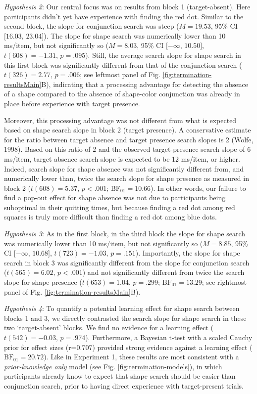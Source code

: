 \documentclass[12pt,twoside]{reedthesis}
\begin{document}
\emph{Hypothesis 2}: Our central focus was on results from block 1 (target-absent). Here participants didn't yet have experience with finding the red dot. Similar to the second block, the slope for conjunction search was steep (\(M = 19.53\), 95\% CI \([16.03\), \(23.04]\)). The slope for shape search was numerically lower than 10 ms/item, but not significantly so (\(M = 8.03\), 95\% CI \([-\infty\), \(10.50]\), \(t(608) = -1.31\), \(p = .095\)). Still, the average search slope for shape search in this first block was significantly different from that of the conjunction search (\(t(326) = 2.77\), \(p = .006\); see leftmost panel of Fig. \ref{fig:termination-resultsMain}B), indicating that a processing advantage for detecting the absence of a shape compared to the absence of shape-color conjunction was already in place before experience with target presence.

Moreover, this processing advantage was not different from what is expected based on shape search slope in block 2 (target presence). A conservative estimate for the ratio between target absence and target presence search slopes is 2 (Wolfe, 1998). Based on this ratio of 2 and the observed target-presence search slope of 6 ms/item, target absence search slope is expected to be 12 ms/item, or higher. Indeed, search slope for shape absence was not significantly different from, and numerically lower than, twice the search slope for shape presence as measured in block 2 (\(t(608) = 5.37\), \(p < .001\); \(\mathrm{BF}_{\textrm{01}} = 10.66\)). In other words, our failure to find a pop-out effect for shape absence was not due to participants being suboptimal in their quitting times, but because finding a red dot among red squares is truly more difficult than finding a red dot among blue dots.

\emph{Hypothesis 3}: As in the first block, in the third block the slope for shape search was numerically lower than 10 ms/item, but not significantly so (\(M = 8.85\), 95\% CI \([-\infty\), \(10.68]\), \(t(723) = -1.03\), \(p = .151\)). Importantly, the slope for shape search in block 3 was significantly different from the slope for conjunction search (\(t(565) = 6.02\), \(p < .001\)) and not significantly different from twice the search slope for shape presence (\(t(653) = 1.04\), \(p = .299\); \(\mathrm{BF}_{\textrm{01}} = 13.29\); see rightmost panel of Fig. \ref{fig:termination-resultsMain}B).

\emph{Hypothesis 4}: To quantify a potential learning effect for shape search between blocks 1 and 3, we directly contrasted the search slope for shape search in these two `target-absent' blocks. We find no evidence for a learning effect (\(t(542) = -0.03\), \(p = .974\)). Furthermore, a Bayesian t-test with a scaled Cauchy prior for effect sizes (r=0.707) provided strong evidence against a learning effect (\(\mathrm{BF}_{\textrm{01}} = 20.72\)). Like in Experiment 1, these results are most consistent with a \emph{prior-knowledge only} model (see Fig. \ref{fig:termination-models}), in which participants already know to expect that shape search should be easier than conjunction search, prior to having direct experience with target-present trials.
\end{document}
